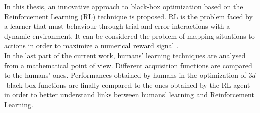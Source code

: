 In this thesis, an innovative approach to black-box optimization based on the Reinforcement Learning (RL) technique is proposed. RL is the problem faced by a learner that must behaviour through trial-and-error interactions with a dynamic environment. It can be considered the problem of mapping situations to actions in order to maximize a numerical reward signal \cite{RLDef1}. \\

In the last part of the current work, humans' learning techniques are analysed from a mathematical point of view. Different acquisition functions are compared to the humans' ones. Performances obtained by humans in the optimization of $3d$-black-box functions are finally compared to the ones obtained by the RL agent in order to better understand links between humans' learning and Reinforcement Learning.